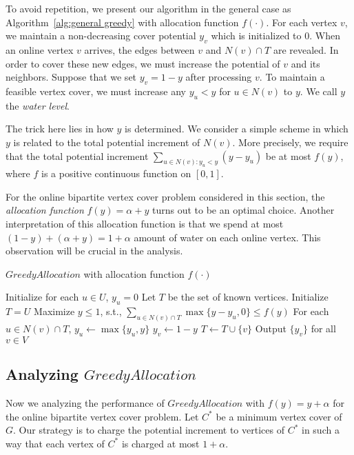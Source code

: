 \documentclass{article}
\begin{document}
To avoid repetition, we present our algorithm in the general case as Algorithm~\ref{alg:general greedy} with allocation function $f(\cdot)$. For each vertex $v$, we maintain a non-decreasing cover potential $y_v$ which is initialized to $0$.
When an online vertex $v$ arrives, the edges between $v$ and $N(v)\cap T$ are revealed. In order to cover these new edges, we must increase the potential of $v$ and its neighbors. Suppose that we set $y_v=1-y$ after processing $v$. To maintain a feasible vertex cover, we must increase any $y_u<y$ for $u\in N(v)$ to $y$. We call $y$ the {\em water level}.

The trick here lies in how $y$ is determined. We consider a simple scheme in which $y$ is related to the total potential increment of $N(v)$. More precisely, we require that the total potential increment $\sum_{u\in N(v):y_u<y}(y-y_u)$ be at most $f(y)$, where $f$ is a positive continuous function on $[0,1]$. 

For the online bipartite vertex cover problem considered in this section, the {\em allocation function} $f(y)=\alpha + y$ turns out to be an optimal choice. Another interpretation of this allocation function is that we spend at most $(1-y)+(\alpha + y)=1+\alpha$ amount of water on each online vertex. This observation will be crucial in the analysis. 






\begin{algorithm}[h!]
\SetAlgoLined
\caption{$GreedyAllocation$ with allocation function $f(\cdot)$}
\label{alg:general greedy}
Initialize for each $u\in U$, $y_u = 0$\;
Let $T$ be the set of known vertices. Initialize $T=U$\;
{
Maximize $y\le 1$, s.t., $\sum_{u\in N(v)\cap T} \max\{y-y_u,0\} \leq f(y)$\;
For each $u\in N(v)\cap T$, $y_u \leftarrow \max\{ y_u, y\}$\;
$y_v \leftarrow 1-y$\;
$T\leftarrow T\cup \{v\}$\;
}
Output $\{y_v\}$ for all $v\in V$\;
\end{algorithm}





\subsection{Analyzing $GreedyAllocation$}



Now we analyzing the performance of $GreedyAllocation$ with $f(y) = y +\alpha$ for the online bipartite vertex cover problem.
Let $C^*$ be a minimum vertex cover of $G$. Our strategy is to charge the potential increment to vertices of $C^*$ in such a way that each vertex of $C^*$ is charged at most $1+\alpha$.
\end{document}
